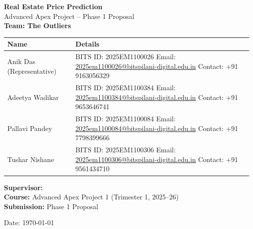 \documentclass[12pt,a4paper]{article}
\begin{document}
\begin{titlepage}
    \centering
    \vspace*{2cm}
    {\LARGE \textbf{Real Estate Price Prediction}} \\[0.5cm]
    {\Large Advanced Apex Project -- Phase 1 Proposal} \\[1.5cm]

    {\large \textbf{Team: The Outliers}} \\[0.5cm]

    \vspace{1cm}
    \begin{tabular}{|p{4cm}|p{10cm}|}
    \hline
    \textbf{Name} & \textbf{Details} \\
    \hline
    Anik Das (Representative) & 
    BITS ID: 2025EM1100026 \newline
    Email: \href{mailto:2025em1100026@bitspilani-digital.edu.in}{2025em1100026@bitspilani-digital.edu.in} \newline
    Contact: +91 9163056329 \\
    \hline
    Adeetya Wadikar & 
    BITS ID: 2025EM1100384 \newline
    Email: \href{mailto:2025em1100384@bitspilani-digital.edu.in}{2025em1100384@bitspilani-digital.edu.in} \newline
    Contact: +91 9653646741 \\
    \hline
    Pallavi Pandey & 
    BITS ID: 2025EM1100084 \newline
    Email: \href{mailto:2025em1100084@bitspilani-digital.edu.in}{2025em1100084@bitspilani-digital.edu.in} \newline
    Contact: +91 7798399666 \\
    \hline
    Tushar Nishane & 
    BITS ID: 2025EM1100306 \newline
    Email: \href{mailto:2025em1100306@bitspilani-digital.edu.in}{2025em1100306@bitspilani-digital.edu.in} \newline
    Contact: +91 9561434710 \\
    \hline
    \end{tabular}

    \vspace{1.5cm}
    \begin{flushleft}
    \textbf{Supervisor:} \underline{\hspace{8cm}} \\[0.5cm]
    \textbf{Course:} Advanced Apex Project 1 (Trimester 1, 2025--26) \\[0.5cm]
    \textbf{Submission:} Phase 1 Proposal \\
    \end{flushleft}

    \vfill
    {\large Date: \today}
\end{titlepage}
\end{document}
